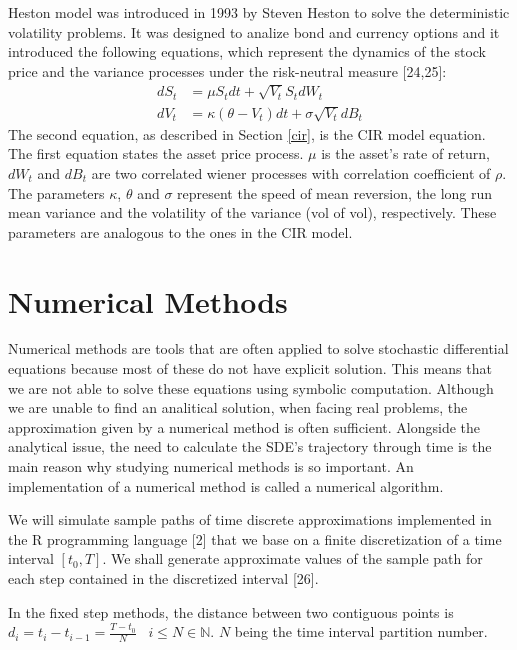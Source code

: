 \documentclass[12pt,oneside]{reedthesis}
\theoremstyle{definition}
\theoremstyle{definition}
\theoremstyle{remark}
\begin{document}
  Heston model was introduced in 1993 by Steven Heston to solve the
  deterministic volatility problems. It was designed to analize bond and
  currency options and it introduced the following equations, which
  represent the dynamics of the stock price and the variance processes
  under the risk-neutral measure {[}24,25{]}:
  \begin{align}
  \label{eq:heston}
  dS_t &= \mu S_t dt + \sqrt{V_t} S_t dW_t \\
  dV_t &=  \kappa (\theta - V_t)dt + \sigma \sqrt{V_t} dB_t
  \label{eq:hesvar}
  \end{align}
  The second equation, as described in Section \ref{cir}, is the CIR model
  equation. The first equation states the asset price process. \(\mu\) is
  the asset's rate of return, \(dW_{t}\) and \(dB_{t}\) are two correlated
  wiener processes with correlation coefficient of \(\rho\). The
  parameters \(\kappa\), \(\theta\) and \(\sigma\) represent the speed of
  mean reversion, the long run mean variance and the volatility of the
  variance (vol of vol), respectively. These parameters are analogous to
  the ones in the CIR model.
  
  \section{Numerical Methods}\label{numerical-methods}
  
  Numerical methods are tools that are often applied to solve stochastic
  differential equations because most of these do not have explicit
  solution. This means that we are not able to solve these equations using
  symbolic computation. Although we are unable to find an analitical
  solution, when facing real problems, the approximation given by a
  numerical method is often sufficient. Alongside the analytical issue,
  the need to calculate the SDE's trajectory through time is the main
  reason why studying numerical methods is so important. An implementation
  of a numerical method is called a numerical algorithm.
  
  We will simulate sample paths of time discrete approximations
  implemented in the R programming language {[}2{]} that we base on a
  finite discretization of a time interval \([t_0, T]\). We shall generate
  approximate values of the sample path for each step contained in the
  discretized interval {[}26{]}.
  
  In the fixed step methods, the distance between two contiguous points is
  \(d_i = t_i - t_{i-1} = \frac{T-t_0}{N} \;\;\; i \leq N \in \mathbb{N}\).
  \(N\) being the time interval partition number.
  
\end{document}
